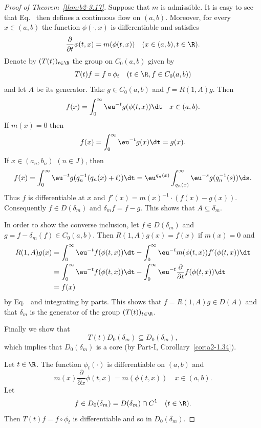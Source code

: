 \begin{proof}[Proof of Theorem~\ref{thm:b2-3.17}]
Suppose that $m$ is admissible.
It is easy to see that Eq.~ then defines a continuous flow on $(a,b)$.
Moreover, for every $x \in (a,b)$ the function $\phi(\cdot,x)$ is differentiable and satisfies
\begin{equation}\label{eq:b2-3.23}
\frac{\partial}{\partial t}\phi(t,x) = m(\phi(t,x)) \quad (x \in (a,b), t \in \R).
\end{equation}
Denote by $(T(t))_{t \in \R}$ the group on $C_{0}(a,b)$ given by 
%
\[
	T(t)f = f \circ \phi_{t} \quad (t \in \R, f \in C_{0}(a,b)) 
\]
%
and let $A$ be its generator.
Take $g \in C_{0}(a,b)$ and $f = R(1,A)g$.
Then %
\[
	f(x) = \int_{0}^{\infty} \eu^{-t}g(\phi(t,x)) \dt \quad x \in (a,b).
\]
%
If\/ $m(x) = 0$ then 
%
\[
	f(x) = \int_{0}^{\infty} \eu^{-t}g(x) \dt = g(x) .
\]
%
If\/ $x \in (a_{n},b_{n})$ $(n \in J)$, then 
\[
f(x) = \int_{0}^{\infty} \eu^{-t}g(q_{n}^{-1}(q_{n}(x) + t)) \dt = \eu^{q_{n}(x)} \int_{q_{n}(x)}^{\infty} \eu^{-s}g(q_{n}^{-1}(s)) \ds.
\]
Thus $f$ is differentiable at $x$ and $f'(x) = m(x)^{-1} \cdot (f(x) - g(x))$.
Consequently $f \in D(\delta_{m})$ and $\delta_{m}f = f - g$.
This shows that $A \subseteq \delta_{m}$.

In order to show the converse inclusion, let $f \in D(\delta_{m})$ and $g = f - \delta_{m}(f) \in C_{0}(a,b)$.
Then $R(1,A)g(x) = f(x)$ if\/ $m(x) = 0$ and 
\begin{align*}
R(1,A)g(x) &= \int_{0}^{\infty} \eu^{-t}f(\phi(t,x)) \dt - \int_{0}^{\infty} \eu^{-t}m(\phi(t,x))f'(\phi(t,x)) \dt \\
           &= \int_{0}^{\infty} \eu^{-t}f(\phi(t,x)) \dt - \int_{0}^{\infty} \eu^{-t}\frac{\partial}{\partial t}f(\phi(t,x)) \dt 
           \\
           &= f(x) 
\end{align*}
by  Eq.~ and integrating by parts.
This shows that $f = R(1,A)g \in D(A)$ and that $\delta_{m}$ is the generator of the group $(T(t))_{t \in \R}$.

Finally we show that 
%
\[
	T(t)D_{0}(\delta_{m}) \subseteq D_{0}(\delta_{m}),
\]
%
which implies that $D_{0}(\delta_{m})$ is a core (by Part-I, Corollary~\ref{cor:a2-1.34}).

Let $t \in \R$.
The function $\phi_{t}(\cdot)$ is
differentiable on $(a,b)$ and 
%
\[
	m(x)\frac{\partial}{\partial x}\phi(t,x) = m(\phi(t,x)) \quad x \in (a,b) .
\]
%
Let 
%
\[
	f \in D_{0}(\delta_{m}) = D(\delta_{m}) \cap C^{1} \quad (t \in \R) .
\]
%
Then $T(t)f = f \circ \phi_{t}$ is differentiable and so in $D_{0}(\delta_{m})$.


\end{proof}
